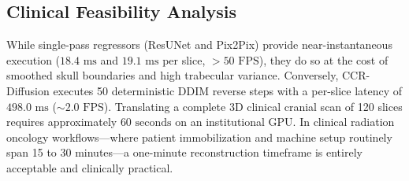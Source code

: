 \begin{table}[!htbp]
\centering
\caption{Computational Efficiency, Latency, and Hardware Resource Profiling}
\label{tab:hardware_profiling}
\small
\renewcommand{\arraystretch}{1.25}
\end{table}

\subsection{Clinical Feasibility Analysis}
While single-pass regressors (ResUNet and Pix2Pix) provide near-instantaneous execution ($18.4\text{ ms}$ and $19.1\text{ ms}$ per slice, $>50\text{ FPS}$), they do so at the cost of smoothed skull boundaries and high trabecular variance. Conversely, CCR-Diffusion executes 50 deterministic DDIM reverse steps with a per-slice latency of $498.0\text{ ms}$ ($\sim 2.0\text{ FPS}$). Translating a complete 3D clinical cranial scan of 120 slices requires approximately $60\text{ seconds}$ on an institutional GPU. In clinical radiation oncology workflows---where patient immobilization and machine setup routinely span 15 to 30 minutes---a one-minute reconstruction timeframe is entirely acceptable and clinically practical.

